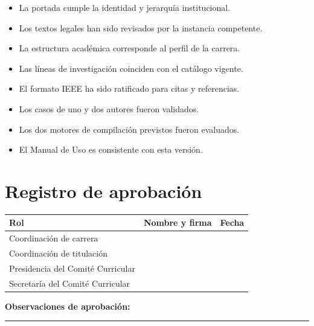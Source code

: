 \documentclass[12pt,a4paper,oneside]{report}
\begin{document}
\begin{itemize}
  \item[$\square$] La portada cumple la identidad y jerarquía institucional.
  \item[$\square$] Los textos legales han sido revisados por la instancia competente.
  \item[$\square$] La estructura académica corresponde al perfil de la carrera.
  \item[$\square$] Las líneas de investigación coinciden con el catálogo vigente.
  \item[$\square$] El formato IEEE ha sido ratificado para citas y referencias.
  \item[$\square$] Los casos de uno y dos autores fueron validados.
  \item[$\square$] Los dos motores de compilación previstos fueron evaluados.
  \item[$\square$] El Manual de Uso es consistente con esta versión.
\end{itemize}

\chapter*{Registro de aprobación}

\vspace{1cm}

\begin{longtable}{|p{4cm}|p{4cm}|p{4cm}|}
  \hline
  \textbf{Rol} & \textbf{Nombre y firma} & \textbf{Fecha} \\
  \hline
  Coordinación de carrera & & \\
  \hline
  Coordinación de titulación & & \\
  \hline
  Presidencia del Comité Curricular & & \\
  \hline
  Secretaría del Comité Curricular & & \\
  \hline
\end{longtable}

\vfill
\noindent\textbf{Observaciones de aprobación:}

\vspace{3cm}
\hrule
\end{document}
